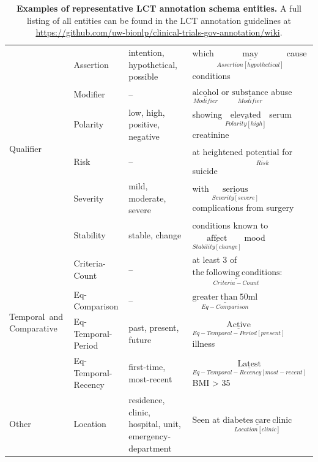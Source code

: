 \documentclass[fleqn,10pt]{wlscirep}
\begin{document}
\begin{table}
\begin{tabular}{m{2cm} m{2.5cm} m{4.9cm} m{6.5cm}}
    \hline
    
    \multirow{6}{}[-16pt]{\mbox{Qualifier}} &
        Assertion
            & intention, hypothetical, possible
            & which $\underset{Assertion[hypothetical]}{\underline{\mathrm{may}}}$ cause conditions \\
         & Modifier
            & --
            & $\underset{Modifier}{\underline{\mathrm{alcohol}}}$ or $\underset{Modifier}{\underline{\mathrm{substance}}}$ abuse  \\
         & Polarity 
                & low, high, positive, negative 
                & showing $\underset{Polarity[high]}{\underline{\mathrm{elevated}}}$ serum creatinine  \\
         & Risk
            & -- 
            & at heightened $\underset{Risk}{\underline{\mathrm{potential}}}$ for suicide \\
         & Severity 
            & mild, moderate, severe 
            & with $\underset{Severity[severe]}{\underline{\mathrm{serious}}}$ complications from surgery  \\
         & Stability 
                & stable, change 
                & conditions known to $\underset{Stability[change]}{\underline{\mathrm{affect}}}$ mood \\[2ex]
    \hline
    \multirow{4}{}[-17pt]{\mbox{Temporal and} Comparative} &
        Criteria-Count
            & --
            & at least 3 of $\underset{Criteria-Count}{\underline{\mathrm{the\ following\ conditions}}}$: \\
     & Eq-Comparison
            & --
            & $\underset{Eq-Comparison}{\underline{\mathrm{greater\ than\ 50ml}}}$ \\
     
     & Eq-Temporal-Period
            & past, present, future
            & $\underset{Eq-Temporal-Period[present]}{\underline{\mathrm{Active}}}$ illness \\
     & Eq-Temporal-Recency
            & first-time, most-recent
            & $\underset{Eq-Temporal-Recency[most-recent]}{\underline{\mathrm{Latest}}}$ BMI > 35 \\
            
    \hline   
    Other &
       Location 
            & residence, clinic, hospital, unit, emergency-department  
            & Seen at $\underset{Location[clinic]}{\underline{\mathrm{diabetes\ care\ clinic}}}$ \\[2ex]
    
\end{tabular}
    \caption{\textbf{Examples of representative LCT annotation schema entities.} A full listing of all entities can be found in the LCT annotation guidelines at \url{https://github.com/uw-bionlp/clinical-trials-gov-annotation/wiki}.}
    \label{tbl_entity_examples}
\end{table} 
\end{document}

